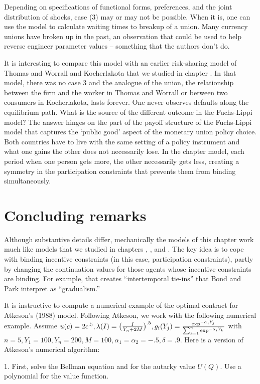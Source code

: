 \newpage

  Depending on  specifications of functional forms, preferences, and the joint distribution of shocks, case (3) may or may not be possible.  When it is, one can use the model to calculate waiting times to breakup of a union.  Many currency unions have broken up in the past, an observation
  that could be used to help reverse engineer parameter values -- something that the authors don't do.

  It is interesting to compare this model with an earlier risk-sharing model of Thomas and Worrall  and Kocherlakota that we studied in chapter . In that model, there was no case 3 and the analogue of the union, the relationship between the firm and the worker in Thomas and Worrall or between two consumers in Kocherlakota, lasts forever. One never observes defaults along the equilibrium path.  What is the source of the different  outcome
   in the Fuchs-Lippi model? The answer hinges on the part of the payoff structure of the Fuchs-Lippi model that
  captures the `public good' aspect of the monetary union policy choice. Both countries have to live with the same setting of a policy instrument
  and what one gains the other does not necessarily lose.  In the chapter  model, each period when one person gets more, the other necessarily gets less, creating a symmetry in the participation constraints that prevents them from binding simultaneously.

\section{Concluding remarks}

Although substantive details differ, mechanically
the models of this chapter work much like models that we studied in
chapters , , and .  The key idea
is to cope with binding incentive constraints (in this case, participation
constraints), partly by changing the continuation values for those
agents whose incentive constraints  are binding.   For example, that creates
``intertemporal tie-ins'' that  Bond and Park
interpret as ``gradualism.''


  It is instructive to compute  a numerical example of the optimal
contract for Atkeson's (1988) model.  Following Atkeson, we work with the
following numerical example.  Assume
$u(c) = 2 c^{.5}, \lambda(I) = \bigl({I \over Y_n + 2M}\bigr)^{.5},
g_i(Y_j)={\exp^{-\alpha_i Y_j} \over \sum_{k=1}^n \exp^{-\alpha_i Y_k}}$
with $n=5, Y_1 =100, Y_n =200, M=100, \alpha_1 = \alpha_2 =-.5, \delta =.9$.
 Here is  a version of  Atkeson's numerical algorithm:
\medskip
\item{1.}  First, solve the Bellman equation  and
for the autarky value $U(Q)$.
Use a polynomial for the value function.
\medskip

